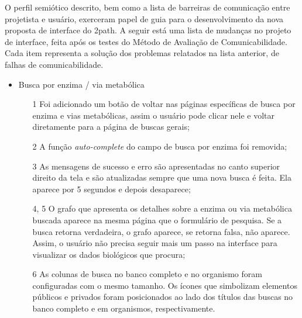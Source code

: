 \indent O perfil semiótico descrito, bem como a lista de barreiras de comunicação entre projetista e usuário, exerceram papel de guia para o desenvolvimento da nova proposta de interface do 2path. A seguir está uma lista de mudanças no projeto de interface, feita após os testes do Método de Avaliação de Comunicabilidade. Cada item representa a solução dos problemas relatados na lista anterior, de falhas de comunicabilidade.

\begin{itemize}
\item Busca por enzima / via metabólica
  \begin{itemize}
  \item[1] Foi adicionado um botão de voltar nas páginas específicas de busca por enzima e vias metabólicas, assim o usuário pode clicar nele e voltar diretamente para a página de buscas gerais;
  \item[2] A função \textit{auto-complete} do campo de busca por enzima foi removida;
  \item[3] As mensagens de sucesso e erro são apresentadas no canto superior direito da tela e são atualizadas sempre que uma nova busca é feita. Ela aparece por 5 segundos e depois desaparece;
  \item[4, 5] O grafo que apresenta os detalhes sobre a enzima ou via metabólica buscada aparece na mesma página que o formulário de pesquisa. Se a busca retorna verdadeira, o grafo aparece, se retorna falsa, não aparece. Assim, o usuário não precisa seguir mais um passo na interface para visualizar os dados biológicos que procura;
  \item[6] As colunas de busca no banco completo e no organismo foram configuradas com o mesmo tamanho. Os ícones que simbolizam elementos públicos e privados foram posicionados ao lado dos títulos das buscas no banco completo e em organismos, respectivamente.
  \end{itemize}
  

\end{itemize}

